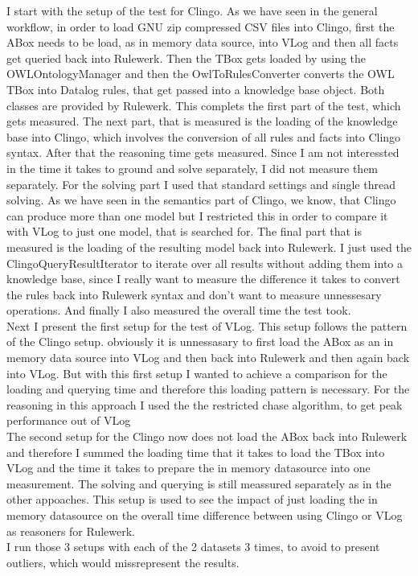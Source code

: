 \documentclass[hyperref, bachelorofscience]{cgvpub}
\begin{document}
I start with the setup of the test for Clingo. As we have seen in the general workflow, in order to load GNU zip compressed CSV files into Clingo, first the ABox needs to be load, as in memory data source, into VLog and then all facts get queried back into Rulewerk. Then the TBox gets loaded by using the OWLOntologyManager and then the OwlToRulesConverter converts the OWL TBox into Datalog rules, that get passed into a knowledge base object. Both classes are provided by Rulewerk. This complets the first part of the test, which gets measured.
The next part, that is measured is the loading of the knowledge base into Clingo, which involves the conversion of all rules and facts into Clingo syntax. After that the reasoning time gets measured. Since I am not interessted in the time it takes to ground and solve separately, I did not measure them separately. For the solving part I used that standard settings and single thread solving. As we have seen in the semantics part of Clingo, we know, that Clingo can produce more than one model but I restricted this in order to compare it with VLog to just one model, that is searched for. The final part that is measured is the loading of the resulting model back into Rulewerk. I just used the ClingoQueryResultIterator to iterate over all results without adding them into a knowledge base, since I really want to measure the difference it takes to convert the rules back into Rulewerk syntax and don't want to measure unnessesary operations. And finally I also measured the overall time the test took.\\

Next I present the first setup for the test of VLog. This setup follows the pattern of the Clingo setup. obviously it is unnessasary to first load the ABox as an in memory data source into VLog and then back into Rulewerk and then again back into VLog. But with this first setup I wanted to achieve a comparison for the loading and querying time and therefore this loading pattern is necessary. For the reasoning in this approach I used the the restricted chase algorithm, to get peak performance out of VLog \\
The second setup for the Clingo now does not load the ABox back into Rulewerk and therefore I summed the loading time that it takes to load the TBox into VLog and the time it takes to prepare the in memory datasource into one measurement. The solving and querying is still meassured separately as in the other appoaches. This setup is used to see the impact of just loading the in memory datasource on the overall time difference between using Clingo or VLog as reasoners for Rulewerk.\\
I run those 3 setups with each of the 2 datasets 3 times, to avoid to present outliers, which would missrepresent the results.
 
\end{document}
